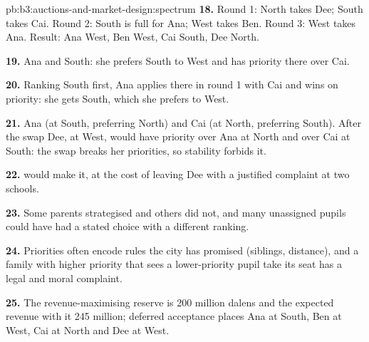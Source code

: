 \begin{solution}{pb:b3:auctions-and-market-design:spectrum}
\textbf{18.} Round 1: North takes Dee; South takes Cai. Round 2: South is full for Ana; West takes Ben.
Round 3: West takes Ana. Result: Ana West, Ben West, Cai South, Dee North.

\textbf{19.} Ana and South: she prefers South to West and has priority there over Cai.

\textbf{20.} Ranking South first, Ana applies there in round 1 with Cai and wins on priority:
she gets South, which she prefers to West.

\textbf{21.} Ana (at South, preferring North) and Cai (at North, preferring South). After the
swap Dee, at West, would have priority over Ana at North and over Cai at South: the swap
breaks her priorities, so stability forbids it.

\textbf{22.}  would make it, at the cost of leaving Dee with a justified
complaint at two schools.

\textbf{23.} Some parents strategised and others did not, and many unassigned pupils
could have had a stated choice with a different ranking.

\textbf{24.} Priorities often encode rules the city has promised (siblings, distance),
and a family with higher priority that sees a lower-priority pupil take its seat has a
legal and moral complaint.

\textbf{25.} The revenue-maximising reserve is 200 million dalens and the expected revenue
with it 245 million; deferred acceptance places Ana at South, Ben at West, Cai at North and Dee
at West.
\end{solution}
